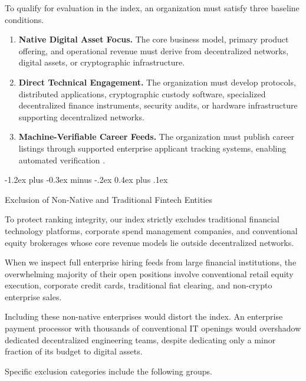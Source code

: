 \documentclass{article}
\makeatletter
\renewcommand\subsection{\@startsection{subsection}{2}{\z@}%
  {-1.2ex plus -0.3ex minus -.2ex}%
  {0.4ex plus .1ex}%
  {\normalsize\bfseries\raggedright}}
\makeatother
\begin{document}
To qualify for evaluation in the index, an organization must satisfy three baseline conditions.

\begin{enumerate}
\item \textbf{Native Digital Asset Focus.} The core business model, primary product offering, and operational revenue must derive from decentralized networks, digital assets, or cryptographic infrastructure.
\item \textbf{Direct Technical Engagement.} The organization must develop protocols, distributed applications, cryptographic custody software, specialized decentralized finance instruments, security audits, or hardware infrastructure supporting decentralized networks.
\item \textbf{Machine-Verifiable Career Feeds.} The organization must publish career listings through supported enterprise applicant tracking systems, enabling automated verification \cite{ref1,ref2,ref3,ref4,ref5}.
\end{enumerate}

\subsection{Exclusion of Non-Native and Traditional Fintech Entities}

To protect ranking integrity, our index strictly excludes traditional financial technology platforms, corporate spend management companies, and conventional equity brokerages whose core revenue models lie outside decentralized networks.

When we inspect full enterprise hiring feeds from large financial institutions, the overwhelming majority of their open positions involve conventional retail equity execution, corporate credit cards, traditional fiat clearing, and non-crypto enterprise sales.

Including these non-native enterprises would distort the index. An enterprise payment processor with thousands of conventional IT openings would overshadow dedicated decentralized engineering teams, despite dedicating only a minor fraction of its budget to digital assets.

Specific exclusion categories include the following groups.
\end{document}
